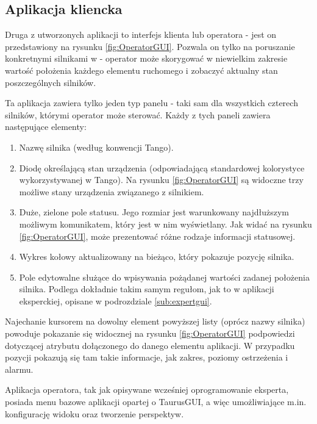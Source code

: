 \subsection{Aplikacja kliencka}
\label{sub:operatorgui}

\quad Druga z utworzonych aplikacji to interfejs klienta lub operatora - jest on przedstawiony na rysunku \ref{fig:OperatorGUI}. Pozwala on tylko na poruszanie konkretnymi silnikami w - operator może skorygować w niewielkim zakresie wartość położenia każdego elementu ruchomego i zobaczyć aktualny stan poszczególnych silników.

Ta aplikacja zawiera tylko jeden typ panelu - taki sam dla wszystkich czterech silników, którymi operator może sterować. Każdy z tych paneli zawiera następujące elementy:
\begin{enumerate}
	\item Nazwę silnika (według konwencji Tango).
	\item Diodę określającą stan urządzenia (odpowiadającą standardowej kolorystyce wykorzystywanej w Tango). Na rysunku \ref{fig:OperatorGUI} są widoczne trzy możliwe stany urządzenia związanego z silnikiem.
	\item Duże, zielone pole statusu. Jego rozmiar jest warunkowany najdłuższym możliwym komunikatem, który jest w nim wyświetlany. Jak widać na rysunku \ref{fig:OperatorGUI}, może prezentować różne rodzaje informacji statusowej.
	\item Wykres kołowy aktualizowany na bieżąco, który pokazuje pozycję silnika.
	\item Pole edytowalne służące do wpisywania pożądanej wartości zadanej położenia silnika. Podlega dokładnie takim samym regułom, jak to w aplikacji eksperckiej, opisane w podrozdziale \ref{sub:expertgui}.
\end{enumerate}

Najechanie kursorem na dowolny element powyższej listy (oprócz nazwy silnika) powoduje pokazanie się widocznej na rysunku \ref{fig:OperatorGUI} podpowiedzi dotyczącej atrybutu dołączonego do danego elementu aplikacji. W przypadku pozycji pokazują się tam takie informacje, jak zakres, poziomy ostrzeżenia i alarmu.

Aplikacja operatora, tak jak opisywane wcześniej oprogramowanie eksperta, posiada menu bazowe aplikacji opartej o TaurusGUI, a więc umożliwiające m.in. konfigurację widoku oraz tworzenie perspektyw.

